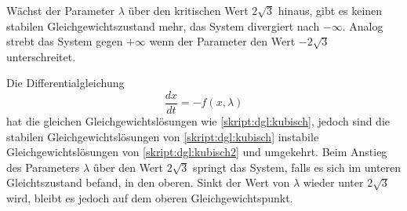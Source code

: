 Wächst der Parameter $\lambda$ über den kritischen Wert $2\sqrt{3}$
hinaus, gibt es keinen stabilen Gleichgewichtszustand mehr, das System
divergiert nach $-\infty$. 
Analog strebt das System gegen $+\infty$ wenn der Parameter den Wert
$-2\sqrt{3}$ unterschreitet.

Die Differentialgleichung 
\begin{equation}
\frac{dx}{dt}
=
-f(x,\lambda)
\label{skript:dgl:kubisch2}
\end{equation}
hat die gleichen Gleichgewichtslösungen wie \eqref{skript:dgl:kubisch},
jedoch sind die stabilen Gleichgewichtslösungen von \eqref{skript:dgl:kubisch}
instabile Gleichgewichtslösungen von \eqref{skript:dgl:kubisch2}
und umgekehrt.
Beim Anstieg des Parameters $\lambda$ über den Wert $2\sqrt{3}$
springt das System, falls es sich im unteren Gleichtszustand befand,
in den oberen.
Sinkt der Wert von $\lambda$ wieder unter $2\sqrt{3}$ wird, bleibt
es jedoch auf dem oberen Gleichgewichtspunkt.


